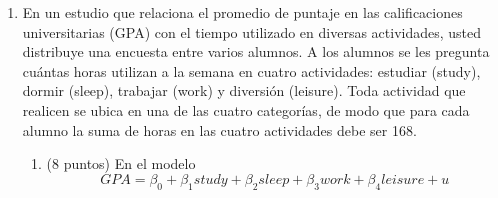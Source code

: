 \documentclass[10pt,a4paper]{article}
\begin{document}
\begin{enumerate}
\begin{enumerate}
\item (10 puntos) Determine el $R^2$ ajustado ($\Bar{R^2}$) de la regresión. Compárelo con el $R^2$ y explique.

{\color{blue}
$SSR/SST=	0,727$

$\bar{R^2}=0,2726$

Es menor al $R^2$ dado que el $\bar{R^2}$ penaliza por la disminución de grados de de libertad al incluir varios regresores al modelo.}

\item (20 puntos) Considerando que:

\[(X^\top X)^{-1} =
\begin{bmatrix}
8,5 & 0,19 & -0,11 \\
0,19 & 0,5 & -0,02 \\
-0,11 & -0,02 & 0,04 \\
\end{bmatrix}
\]

$$ \sum_{i=1}^{n} (y_i - \bar{y})^2=6.800$$
Determine la varianza de los estimadores de la regresión MCO.

{\color{blue} 


$$\hat{\sigma}^2 = \frac{\sum_{i=1}^{n} \hat{u}_i^2 }{n-k-1}= \frac{SSR}{n - k - 1}=1,1958$$
    
    \[
\text{Var}(\hat{\beta}|X) = \hat{\sigma}^2(X^{\top}X)^{-1}
\]

Solo necesitamos la varianza de los estimadores así que  os quedamos con los elementos de la diagonal de la matriz de var-covar.

$$\text{Var}(\hat{\beta_0}|X)=10,1643\quad 
\text{Var}(\hat{\beta_1}|X)=0,5979
\quad \text{Var}(\hat{\beta_2}|X)=0,0478$$}
\end{enumerate}

\item En un estudio que relaciona el promedio de puntaje en las calificaciones universitarias (GPA) con el
tiempo utilizado en diversas actividades, usted distribuye una encuesta entre varios alumnos.
A los alumnos se les pregunta cuántas horas utilizan a la semana en cuatro actividades: estudiar (study),
dormir (sleep), trabajar (work) y diversión (leisure). Toda actividad que realicen se ubica en una de las cuatro categorías,
de modo que para cada alumno la suma de horas en las cuatro actividades debe ser 168.
\begin{enumerate}
    \item(8 puntos) En el modelo
$$GPA=\beta_0 +\beta_1 study+\beta_2 sleep+\beta_3 work +\beta_4leisure+ u$$


\end{enumerate}
\end{enumerate}
\end{document}
